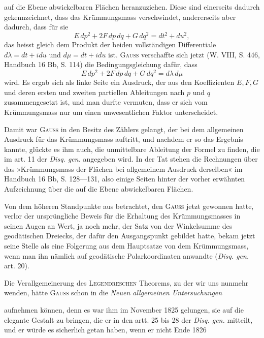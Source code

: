 auf die Ebene abwickelbaren Flächen heranzuziehen. Diese sind einerseits
dadurch gekennzeichnet, dass das Krümmungsmass verschwindet, andererseits
aber dadurch, dass für sie
\[
E\,dp^2+2F\,dp\,dq+G\,dq^2=dt^2+du^2,
\]
\noindent das heisst gleich dem Produkt der beiden vollständigen Differentiale \(d\lambda=dt+idu\)
und \(d\mu=dt+idu\) ist. \textsc{Gauss} verschaffte sich jetzt (W. VIII, S. 446,
Handbuch 16 Bb, S. 114) die Bedingungsgleichung dafür, dass
\[
E\,dp^2+2F\,dp\,dq+G\,dq^2=d\lambda\,d\mu
\]
\noindent wird. Es ergab sich als linke Seite ein Ausdruck, der aus den Koeffizienten
\(E,F,G\) und deren ersten und zweiten partiellen Ableitungen nach \(p\) und \(q\)
zusammengesetzt ist, und man durfte vermuten, dass er sich vom Krümmungsmass
nur um einen unwesentlichen Faktor unterscheidet.
\par
Damit war \textsc{Gauss} in den Besitz des Zählers gelangt, der bei dem allgemeinen
Ausdruck für das Krümmungsmass auftritt, und nachdem er so das
Ergebnis kannte, glückte es ihm auch, die unmittelbare Ableitung der Formel
zu finden, die im art. 11 der \textit{Disq. gen.} angegeben wird. In der Tat stehen
die Rechnungen über das »Krümmungsmass der Flächen bei allgemeinem Ausdruck
derselben« im Handbuch 16 Bb, S. 128—131, also einige Seiten hinter
der vorher erwähnten Aufzeichnung über die auf die Ebene abwickelbaren
Flächen.
\par
Von dem höheren Standpunkte aus betrachtet, den \textsc{Gauss} jetzt gewonnen
hatte, verlor der ursprüngliche Beweis für die Erhaltung des Krümmungsmasses
in seinen Augen an Wert, ja noch mehr, der Satz von der Winkelsumme
des geodätischen Dreiecks, der dafür den Ausgangspunkt gebildet hatte,
bekam jetzt seine Stelle als eine Folgerung aus dem Hauptsatze von dem
Krümmungsmass, wenn man ihn nämlich auf geodätische Polarkoordinaten
anwandte (\textit{Disq. gen.} art. 20).
\par
Die Verallgemeinerung des \textsc{Legendreschen} Theorems, zu der wir uns
nunmehr wenden, hätte \textsc{Gauss} schon in die \textit{Neuen allgemeinen Untersuchungen}
\par\smallskip{}\par
\clearpage{}\setcounter{footnote}{0}
\noindent aufnehmen können, denn es war ihm im November 1825 gelungen, sie auf
die elegante Gestalt zu bringen, die er in den artt. 25 bis 28 der \textit{Disq. gen.}
mitteilt, und er würde es sicherlich getan haben, wenn er nicht Ende 1826
